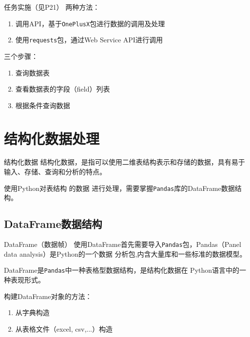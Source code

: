\documentclass[t]{beamer}
\begin{document}
\begin{frame}{任务实施（见P21）}
两种方法：
\begin{enumerate}
    \item 调用API，基于\texttt{OnePlusX}包进行数据的调用及处理
    \item 使用\texttt{requests}包，通过Web Service API进行调用
\end{enumerate}

\vskip 1cm

三个步骤：
\begin{enumerate}
    \item 查询数据表
    \item 查看数据表的字段（field）列表
    \item 根据条件查询数据
\end{enumerate}
\end{frame}

\section{结构化数据处理}


\begin{frame}[fragile]{结构化数据}
结构化数据，是指可以使用二维表结构表示和存储的数据，具有易于输入、存储、查询和分析的特点。

使用Python对表结构 的数据 进行处理，需要掌握\verb|Pandas|库的DataFrame数据结构。

\end{frame}


\subsection{DataFrame数据结构}
\begin{frame}[fragile]{DataFrame（数据帧）}
    使用DataFrame首先需要导入\verb|Pandas|包，Pandas（{\color{red}Pan}el {\color{red}d}ata {\color{red}a}nalysi{\color{red}s}）是Python的一个数据
    分析包,内含大量库和一些标准的数据模型。

    DataFrame是\verb|Pandas|中一种表格型数据结构，是结构化数据在
    Python语言中的一种表现形式。

    构建DataFrame对象的方法：
\begin{enumerate}
    \item 从字典构造
    \item 从表格文件（excel, csv,...）构造
\end{enumerate}

\end{frame}
\end{document}

